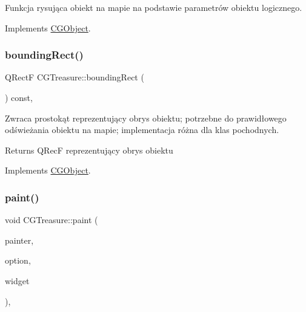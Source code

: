 Funkcja rysująca obiekt na mapie na podstawie parametrów obiektu logicznego. 



Implements \mbox{\hyperlink{class_c_g_object_a859e765fbb3ab0d6ad73ca58e5e49779}{C\+G\+Object}}.

\mbox{\label{class_c_g_treasure_a103be7d49202d07d9260917a7d6e8429}} 
\subsubsection{\texorpdfstring{bounding\+Rect()}{boundingRect()}}
{\footnotesize\ttfamily Q\+RectF C\+G\+Treasure\+::bounding\+Rect (\begin{DoxyParamCaption}{ }\end{DoxyParamCaption}) const\hspace{0.3cm}{\ttfamily [override]}, {\ttfamily [virtual]}}



Zwraca prostokąt reprezentujący obrys obiektu; potrzebne do prawidłowego odświeżania obiektu na mapie; implementacja różna dla klas pochodnych. 

\begin{DoxyReturn}{Returns}
Q\+RecF reprezentujący obrys obiektu 
\end{DoxyReturn}


Implements \mbox{\hyperlink{class_c_g_object_ab9edf3d10a53c254cdb5d3d8de930207}{C\+G\+Object}}.

\mbox{\label{class_c_g_treasure_aeab69a95590acb46aa4d20422be96560}} 
\subsubsection{\texorpdfstring{paint()}{paint()}}
{\footnotesize\ttfamily void C\+G\+Treasure\+::paint (\begin{DoxyParamCaption}\item[{Q\+Painter $\ast$}]{painter,  }\item[{const Q\+Style\+Option\+Graphics\+Item $\ast$}]{option,  }\item[{Q\+Widget $\ast$}]{widget }\end{DoxyParamCaption})\hspace{0.3cm}{\ttfamily [override]}, {\ttfamily [virtual]}}



